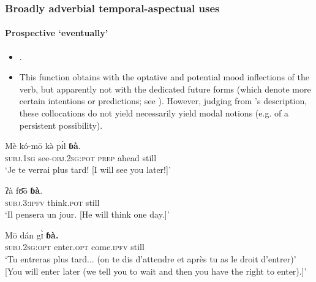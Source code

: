	
\subsubsection{Broadly adverbial temporal-aspectual uses}
\paragraph{Prospective \lq eventually\rq{}} \label{appendixMundangProspective}
\begin{itemize}
	\item \textcite[382]{Elders2000}.
	\item This function obtains with the optative and potential mood inflections of the verb, but apparently not with the dedicated future forms (which denote more certain intentions or predictions; see \cite[371–373]{Elders2000}). However, judging from \citeauthor{Elders2000}'s description, these collocations do not yield necessarily yield modal notions (e.g. of a persistent possibility).
\end{itemize}
\begin{exe}
	\ex \label{exAppendixMundangFuture1}
	\gll Mè kó-mō kə̀ pɪ́l \textbf{ɓà}.\\
	\textsc{subj}.1\textsc{sg} see-\textsc{obj}.2\textsc{sg}:\textsc{pot} \textsc{prep} ahead still\\
	\glt \lq Je te verrai plus tard! [I will see you later!]' \parencite[382]{Elders2000}

	\ex
	\gll ʔà fʊ̄ō \textbf{ɓà}.\\
	\textsc{subj}.3:\textsc{ipfv} think.\textsc{pot} still\\ 
	\glt \lq Il pensera un jour. [He will think one day.]' \parencite[382]{Elders2000}

	\ex 
	\gll Mō dán gɪ̀ \textbf{ɓà.}\\
	\textsc{subj}.2\textsc{sg}:\textsc{opt} enter.\textsc{opt} come.\textsc{ipfv} still\\
	\glt \lq Tu entreras plus tard... (on te dis d’attendre et après tu as le droit d’entrer)' [You will enter later (we tell you to wait and then you have the right to enter).]'  \parencite[382]{Elders2000}
\end{exe}

